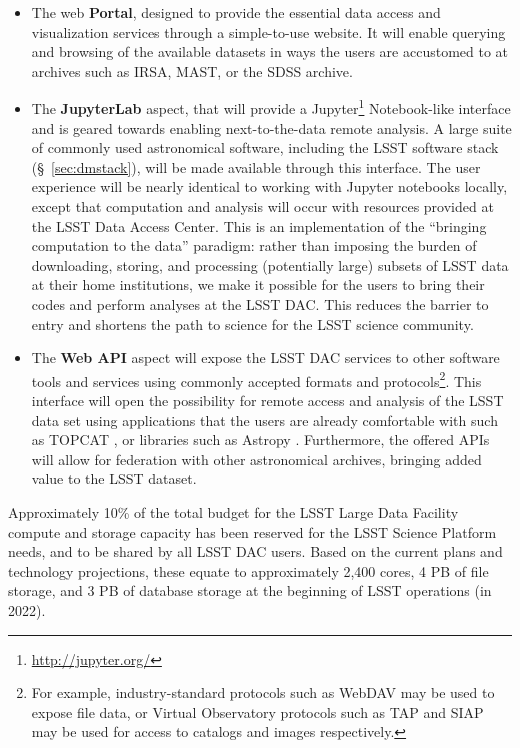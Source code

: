 \begin{itemize}

\item The web \textbf{Portal}, designed to provide the essential data access and
visualization services through a simple-to-use website.  It will enable
querying and browsing of the available datasets in ways the users are
accustomed to at archives such as IRSA, MAST, or the SDSS archive.

\item The \textbf{JupyterLab} aspect, that will provide a
Jupyter\footnote{\url{http://jupyter.org/}} Notebook-like
interface and is geared towards enabling next-to-the-data remote analysis.
A large suite of commonly used astronomical software, including the LSST
software stack (\S~\ref{sec:dmstack}), will be made available through this
interface.  The user experience will be nearly identical to working with
Jupyter notebooks locally, except that computation and analysis will occur
with resources provided at the LSST Data Access Center.  This is an
implementation of the ``bringing computation to the data'' paradigm: rather
than imposing the burden of downloading, storing, and processing
(potentially large) subsets of LSST data at their home institutions, we make
it possible for the users to bring their codes and perform analyses at the
LSST DAC.  This reduces the barrier to entry and shortens the path to
science for the LSST science community.

\item The \textbf{Web API} aspect will expose the LSST DAC services to other
software tools and services using commonly accepted formats and protocols\footnote{For
example, industry-standard protocols such as WebDAV may be used to expose
file data, or Virtual Observatory protocols such as TAP and SIAP may
be used for access to catalogs and images respectively.}.  This interface will open the
possibility for remote access and analysis of the LSST data set using
applications that the users are already comfortable with such as
TOPCAT \citep{2005ASPC..347...29T}, or libraries such as Astropy \citep{2013A&A...558A..33A,2016SPIE.9913E..0GJ}.  Furthermore, the offered APIs will allow
for federation with other astronomical archives, bringing added value to the
LSST dataset.
\end{itemize}

Approximately 10\% of the total budget for the LSST Large Data Facility
compute and storage capacity has been reserved for the LSST Science Platform
needs, and to be shared by all LSST DAC users.  Based on the current plans and
technology projections, these equate to approximately 2,400 cores, 4 PB of
file storage, and 3 PB of database storage at the beginning of LSST
operations (in 2022).


